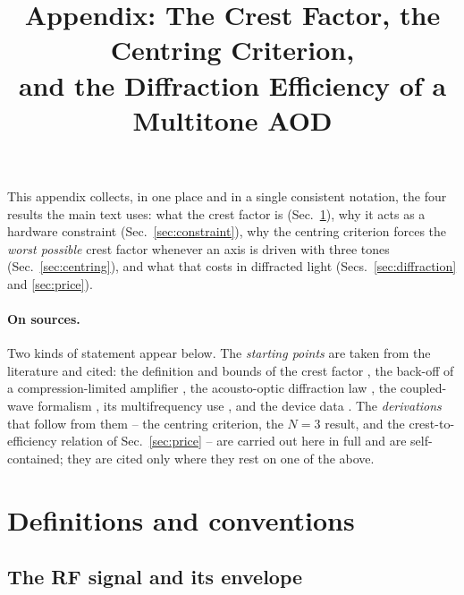 \documentclass[11pt,a4paper]{article}
\title{Appendix: The Crest Factor, the Centring Criterion,\\
       and the Diffraction Efficiency of a Multitone AOD}
\author{}
\date{}
\begin{document}
\maketitle

\noindent
This appendix collects, in one place and in a single consistent notation,
the four results the main text uses: what the crest factor is
(Sec.~\ref{sec:defs}), why it acts as a hardware constraint
(Sec.~\ref{sec:constraint}), why the centring criterion forces the
\emph{worst possible} crest factor whenever an axis is driven with three
tones (Sec.~\ref{sec:centring}), and what that costs in diffracted light
(Secs.~\ref{sec:diffraction} and \ref{sec:price}).

\paragraph{On sources.} Two kinds of statement appear below. The
\emph{starting points} are taken from the literature and cited: the
definition and bounds of the crest factor \cite{schroeder1970,boyd1986}, the
back-off of a compression-limited amplifier
\cite{cripps2006,pozar2012}, the acousto-optic diffraction law
\cite{salehteich2019,aaoptonotes}, the coupled-wave formalism
\cite{kogelnik1969,laude2003}, its multifrequency use
\cite{antonov2007}, and the device data \cite{aaaod,minicircuits}. The
\emph{derivations} that follow from them -- the centring criterion, the
$N=3$ result, and the crest-to-efficiency relation of
Sec.~\ref{sec:price} -- are carried out here in full and are self-contained;
they are cited only where they rest on one of the above.

\section{Definitions and conventions}\label{sec:defs}

\subsection{The RF signal and its envelope}
\end{document}
